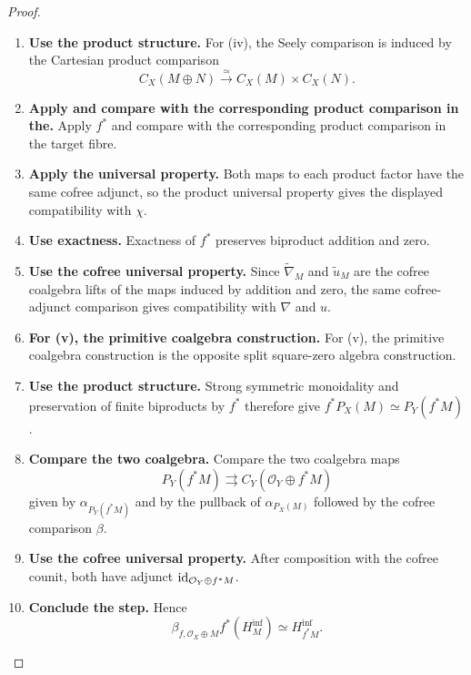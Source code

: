 \begin{proof}
\begin{enumerate}[label=\textup{(\arabic*)}]
    \item \textbf{Use the product structure.}
    For \textup{(iv)}, the Seely comparison is induced by the Cartesian product comparison
    \[
        C_X(M\oplus N)\xrightarrow{\simeq}C_X(M)\times C_X(N).
    \]

    \item \textbf{Apply and compare with the corresponding product comparison in the.}
    Apply \(f^*\) and compare with the corresponding product comparison in the target fibre.

    \item \textbf{Apply the universal property.}
    Both maps to each product factor have the same cofree adjunct, so the product universal
    property gives the displayed compatibility with \(\chi\).

    \item \textbf{Use exactness.}
    Exactness of \(f^*\) preserves biproduct addition and zero.

    \item \textbf{Use the cofree universal property.}
    Since \(\widetilde\nabla_M\) and \(\widetilde u_M\) are the cofree coalgebra lifts of the maps induced by
    addition and zero, the same cofree-adjunct comparison gives compatibility with \(\nabla\)
    and \(u\).

    \item \textbf{For (v), the primitive coalgebra construction.}
    For \textup{(v)}, the primitive coalgebra construction is the opposite split square-zero
    algebra construction.

    \item \textbf{Use the product structure.}
    Strong symmetric monoidality and preservation of finite biproducts by \(f^*\) therefore
    give \(f^*P_X(M)\simeq P_Y(f^*M)\).

    \item \textbf{Compare the two coalgebra.}
    Compare the two coalgebra maps
    \[
        P_Y(f^*M)\rightrightarrows C_Y(\mathcal O_Y\oplus f^*M)
    \]
    given by \(\alpha_{P_Y(f^*M)}\) and by the pullback of \(\alpha_{P_X(M)}\) followed by the cofree comparison
    \(\beta\).

    \item \textbf{Use the cofree universal property.}
    After composition with the cofree counit, both have adjunct \(\operatorname{id}_{\mathcal O_Y\oplus f^*M}\).

    \item \textbf{Conclude the step.}
    Hence
    \[
        \beta_{f,\mathcal O_X\oplus M}f^*(H^{\inf}_M)
        \simeq
        H^{\inf}_{f^*M}.
    \]


\end{enumerate}
\end{proof}
